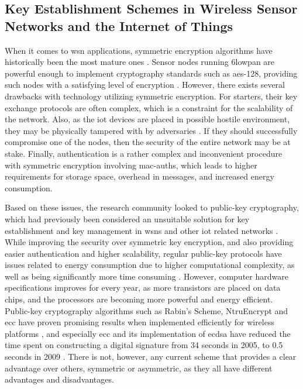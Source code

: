 

\subsection{Key Establishment Schemes in Wireless Sensor Networks and the Internet of Things}

When it comes to \gls{wsn} applications, symmetric encryption algorithms have historically been the most mature ones \citep{Jing2014}. Sensor nodes running \gls{6lowpan} are powerful enough to implement cryptography standards such as \gls{aes}-128, providing such nodes with a satisfying level of encryption \cite{Roman2011147}. However, there exists several drawbacks with technology utilizing symmetric encryption. For starters, their key exchange protocols are often complex, which is a constraint for the scalability of the network. Also, as the \gls{iot} devices are placed in possible hostile environment, they may be physically tampered with by adversaries \cite{krentz20136lowpan}. If they should successfully compromise one of the nodes, then the security of the entire network may be at stake. Finally, authentication is a rather complex and inconvenient procedure with symmetric encryption involving \gls{mac-auth}s, which leads to higher requirements for storage space, overhead in messages, and increased energy consumption.

Based on these issues, the research community looked to public-key cryptography, which had previously been considered  an unsuitable solution for key establishment and key management in \gls{wsn}s and other \gls{iot} related networks \cite{gaubatz2004public, wander2005energy}. While improving the security over symmetric key encryption, and also providing easier authentication and higher scalability, regular public-key protocols have issues related to energy consumption due to higher computational complexity, as well as being significantly more time consuming \cite{Eschenauer2002}. However, computer hardware specifications improves for every year, as more transistors are placed on data chips, and the processors are becoming more powerful and energy efficient. Public-key cryptography algorithms such as Rabin's Scheme, NtruEncrypt and \gls{ecc} have proven promising results when implemented efficiently for wireless platforms \cite{Jing2014}, and especially \gls{ecc} and its implementation of \gls{ecdsa} have reduced the time spent on constructing a digital signature from 34 seconds in 2005, to 0.5 seconds in 2009 \cite{Roman2011147}. There is not, however, any current scheme that provides a clear advantage over others, symmetric or asymmetric, as they all have different advantages and disadvantages. 

